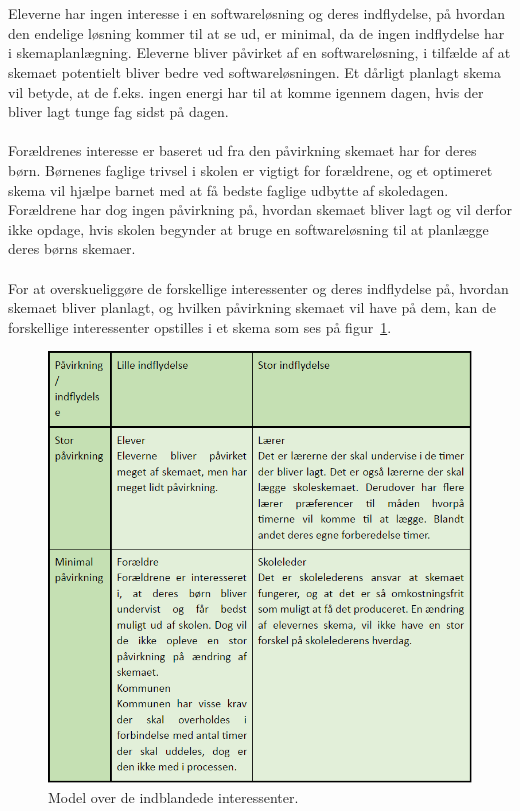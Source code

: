 \\\\
Eleverne har ingen interesse i en softwareløsning og deres indflydelse, på hvordan den endelige løsning kommer til at se ud, er minimal, da de ingen indflydelse har i skemaplanlægning. Eleverne bliver påvirket af en softwareløsning, i tilfælde af at skemaet potentielt bliver bedre ved softwareløsningen. Et dårligt planlagt skema vil betyde, at de f.eks. ingen energi har til at komme igennem dagen, hvis der bliver lagt tunge fag sidst på dagen.
\\\\
Forældrenes interesse er baseret ud fra den påvirkning skemaet har for deres børn. Børnenes faglige trivsel i skolen er vigtigt for forældrene, og et optimeret skema vil hjælpe barnet med at få bedste faglige udbytte af skoledagen. Forældrene har dog ingen påvirkning på, hvordan skemaet bliver lagt og vil derfor ikke opdage, hvis skolen begynder at bruge en softwareløsning til at planlægge deres børns skemaer.
\\\\
For at overskueliggøre de forskellige interessenter og deres indflydelse på, hvordan skemaet bliver planlagt, og hvilken påvirkning skemaet vil have på dem, kan de forskellige interessenter opstilles i et skema som ses på figur~\ref{fig:interessenter}.
\begin{figure}[!h]
  \centering
  \includegraphics[width=\textwidth]{partials/graphics/interessentanalyse.png}
  \caption{Model over de indblandede interessenter.}
  \label{fig:interessenter}
\end{figure}
